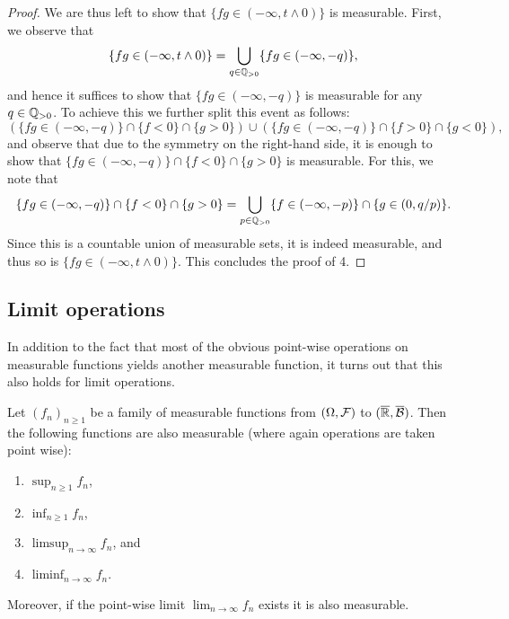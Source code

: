 \begin{proof}
We are thus left to show that $\{fg \in (-\infty, t \wedge 0)\}$ is measurable. First, we observe that
\[
	\{fg \in (-\infty, t \wedge 0)\} = \bigcup_{q \in \mathbb Q_{>0}} \{fg \in (-\infty,-q)\},
\]
and hence it suffices to show that $\{fg \in (-\infty,-q)\}$ is measurable for any $q \in \mathbb Q_{>0}$. To achieve this we further split this event as follows:
\[
	\left(\{fg \in (-\infty,-q)\} \cap \{f < 0\} \cap \{g > 0\}\right) 
	\cup \left(\{fg \in (-\infty,-q)\} \cap \{f > 0\} \cap \{g < 0\}\right),
\]
and observe that due to the symmetry on the right-hand side, it is enough to show that $\{fg \in (-\infty,-q)\} \cap \{f < 0\} \cap \{g > 0\}$ is measurable. For this, we note that
\[
	\{fg \in (-\infty,-q)\} \cap \{f < 0\} \cap \{g > 0\} 
	= \bigcup_{p \in \mathbb Q_{>0}} \{f \in (-\infty, -p)\} \cap \{g \in (0, q/p)\}.
\]
Since this is a countable union of measurable sets, it is indeed measurable, and thus so is $\{fg \in (-\infty, t \wedge 0)\}$. This concludes the proof of 4.
\end{proof}


\subsection{Limit operations}

In addition to the fact that most of the obvious point-wise operations on measurable functions yields another measurable function, it turns out that this also holds for limit operations. 

\begin{lemma}\label{lem:limit_operations_measurable_functions}
Let $(f_n)_{n \ge 1}$ be a family of measurable functions from $(\Omega, \mathcal F)$ to  $(\overline{\mathbb R}, \overline{\mathcal B})$. Then the following functions are also measurable (where again operations are taken point wise):
\begin{enumerate}
\item $\sup_{n \ge 1} f_n$,
\item $\inf_{n \ge 1} f_n$,
\item $\limsup_{n \to \infty} f_n$, and
\item $\liminf_{n \to \infty} f_n$.
\end{enumerate}

Moreover, if the point-wise limit $\lim_{n \to \infty} f_n$ exists it is also measurable. 
\end{lemma}

